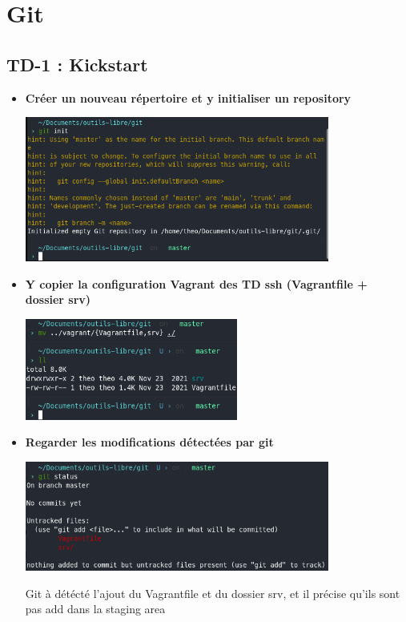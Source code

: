 \documentclass[12pt]{article}
\begin{document}
  \section{Git}

  \subsection{TD-1 : Kickstart}
  \vspace{0.3cm}

\begin{itemize}
  \item \textbf{Créer un nouveau répertoire et y initialiser un repository}
  \vspace{0.3cm}

  \includegraphics[width=10cm]{images/screen-git-td1-1.png}
\end{itemize}
\vspace{0.3cm}

\begin{itemize}
  \item \textbf{Y copier la configuration Vagrant des TD ssh (Vagrantfile + dossier srv)}
  \vspace{0.3cm}

  \includegraphics[width=7cm]{images/screen-git-td1-2.png}
\end{itemize}
\vspace{0.3cm}

\begin{itemize}
  \item \textbf{Regarder les modifications détectées par git}
  \vspace{0.3cm}

  \includegraphics[width=10cm]{images/screen-git-td1-3.png}
  \vspace{0.3cm}

  Git à détécté l'ajout du Vagrantfile et du dossier srv, et il précise qu'ils sont pas add dans la staging area
\end{itemize}
\vspace{0.3cm}
\end{document}
